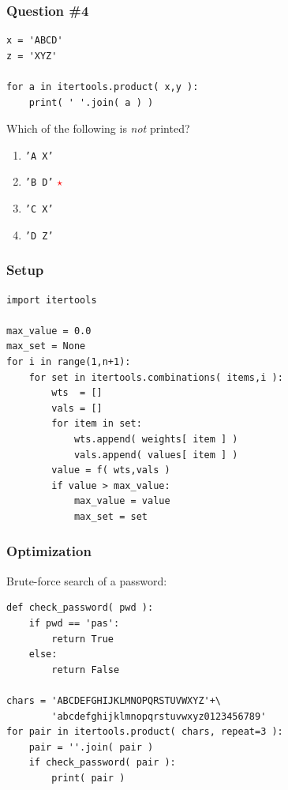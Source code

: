 \documentclass[11pt]{beamer}
\newcommand{\correctstar}{\textcolor{red}{$\star$}}
\begin{document}
\begin{frame}[fragile]
  \frametitle{Question \#4}

  \begin{Verbatim}
x = 'ABCD'
z = 'XYZ'

for a in itertools.product( x,y ):
    print( ' '.join( a ) )
  \end{Verbatim}

Which of the following is \emph{not} printed?

  \begin{enumerate}[label=\Alph*]
    \item  \texttt{'A X'}
    \item  \texttt{'B D'}  \correctstar
    \item  \texttt{'C X'}
    \item  \texttt{'D Z'}
  \end{enumerate}
\end{frame}

\begin{frame}[fragile]
  \frametitle{Setup}

  \begin{Verbatim}
import itertools

max_value = 0.0
max_set = None
for i in range(1,n+1):
    for set in itertools.combinations( items,i ):
        wts  = []
        vals = []
        for item in set:
            wts.append( weights[ item ] )
            vals.append( values[ item ] )
        value = f( wts,vals )
        if value > max_value:
            max_value = value
            max_set = set
  \end{Verbatim}
\end{frame}

\begin{frame}[fragile]
  \frametitle{Optimization}

  \begin{enumerate}
  \myitem  Brute-force search of a password: %
  \end{enumerate}
  \begin{Verbatim}
def check_password( pwd ):
    if pwd == 'pas':
        return True
    else:
        return False

chars = 'ABCDEFGHIJKLMNOPQRSTUVWXYZ'+\
        'abcdefghijklmnopqrstuvwxyz0123456789'
for pair in itertools.product( chars, repeat=3 ):
    pair = ''.join( pair )
    if check_password( pair ):
        print( pair )
  \end{Verbatim}
\end{frame}
\end{document}
